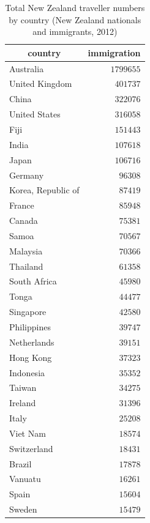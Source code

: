 \documentclass{article}
\begin{document}
\begin{table}
\caption{Total New Zealand traveller numbers by country (New Zealand nationals and immigrants, 2012)}
\begin{center}
\begin{tabular}{lr}
\hline\hline
\multicolumn{1}{c}{country}&\multicolumn{1}{c}{immigration}\tabularnewline
\hline
Australia&$1799655$\tabularnewline
United Kingdom&$ 401737$\tabularnewline
China&$ 322076$\tabularnewline
United States&$ 316058$\tabularnewline
Fiji&$ 151443$\tabularnewline
India&$ 107618$\tabularnewline
Japan&$ 106716$\tabularnewline
Germany&$  96308$\tabularnewline
Korea, Republic of&$  87419$\tabularnewline
France&$  85948$\tabularnewline
Canada&$  75381$\tabularnewline
Samoa&$  70567$\tabularnewline
Malaysia&$  70366$\tabularnewline
Thailand&$  61358$\tabularnewline
South Africa&$  45980$\tabularnewline
Tonga&$  44477$\tabularnewline
Singapore&$  42580$\tabularnewline
Philippines&$  39747$\tabularnewline
Netherlands&$  39151$\tabularnewline
Hong Kong&$  37323$\tabularnewline
Indonesia&$  35352$\tabularnewline
Taiwan&$  34275$\tabularnewline
Ireland&$  31396$\tabularnewline
Italy&$  25208$\tabularnewline
Viet Nam&$  18574$\tabularnewline
Switzerland&$  18431$\tabularnewline
Brazil&$  17878$\tabularnewline
Vanuatu&$  16261$\tabularnewline
Spain&$  15604$\tabularnewline
Sweden&$  15479$\tabularnewline
\hline
\end{tabular}\end{center}\label{table:immigration12}
\end{table}

\end{document}
